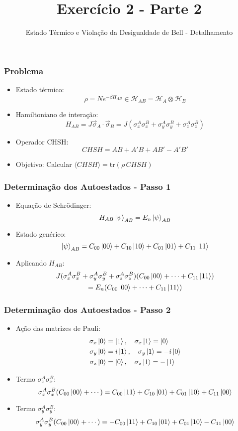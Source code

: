\documentclass{beamer}
\title{Exercício 2 - Parte 2}
\subtitle{Estado Térmico e Violação da Desigualdade de Bell - Detalhamento}
\author{}
\date{}
\begin{document}
	
	\frame{\titlepage}
	
	\begin{frame}
		\frametitle{Problema}
		\begin{itemize}
			\item Estado térmico:
			\[
			\rho = N e^{-\beta H_{AB}} \in \mathcal{H}_{AB} = \mathcal{H}_A \otimes \mathcal{H}_B
			\]
			\item Hamiltoniano de interação:
			\[
			H_{AB} = J \vec{\sigma}_A \cdot \vec{\sigma}_B = J(\sigma_x^A \sigma_x^B + \sigma_y^A \sigma_y^B + \sigma_z^A \sigma_z^B)
			\]
			\item Operador CHSH:
			\[
			CHSH = AB + A'B + AB' - A'B'
			\]
			\item Objetivo: Calcular $\langle CHSH \rangle = \text{tr}(\rho\, CHSH)$
		\end{itemize}
	\end{frame}
	
	\begin{frame}
		\frametitle{Determinação dos Autoestados - Passo 1}
		\begin{itemize}
			\item Equação de Schrödinger:
			\[
			H_{AB} \ket{\psi}_{AB} = E_n \ket{\psi}_{AB}
			\]
			\item Estado genérico:
			\[
			\ket{\psi}_{AB} = C_{00}\ket{00} + C_{10}\ket{10} + C_{01}\ket{01} + C_{11}\ket{11}
			\]
			\item Aplicando $H_{AB}$:
			\begin{multline*}
				J(\sigma_x^A \sigma_x^B + \sigma_y^A \sigma_y^B + \sigma_z^A \sigma_z^B)(C_{00}\ket{00} + \cdots + C_{11}\ket{11}) \\
				= E_n (C_{00}\ket{00} + \cdots + C_{11}\ket{11})
			\end{multline*}
		\end{itemize}
	\end{frame}
	
	\begin{frame}
		\frametitle{Determinação dos Autoestados - Passo 2}
		\begin{itemize}
			\item Ação das matrizes de Pauli:
			\begin{align*}
				\sigma_x \ket{0} &= \ket{1}, \quad \sigma_x \ket{1} = \ket{0} \\
				\sigma_y \ket{0} &= i\ket{1}, \quad \sigma_y \ket{1} = -i\ket{0} \\
				\sigma_z \ket{0} &= \ket{0}, \quad \sigma_z \ket{1} = -\ket{1}
			\end{align*}
			\item Termo $\sigma_x^A \sigma_x^B$:
			\[
			\sigma_x^A \sigma_x^B (C_{00}\ket{00} + \cdots) = C_{00}\ket{11} + C_{10}\ket{01} + C_{01}\ket{10} + C_{11}\ket{00}
			\]
			\item Termo $\sigma_y^A \sigma_y^B$:
			\[
			\sigma_y^A \sigma_y^B (C_{00}\ket{00} + \cdots) = -C_{00}\ket{11} + C_{10}\ket{01} + C_{01}\ket{10} - C_{11}\ket{00}
			\]
		\end{itemize}
	\end{frame}
	
\end{document}
